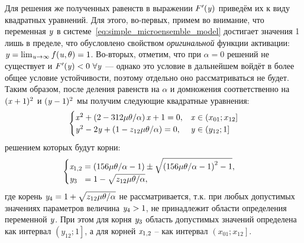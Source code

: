 Для решения же полученных равенств в выражении $F^{\prime}(\mathit{y})$ приведём их к виду квадратных уравнений. Для этого, во-первых, примем во внимание, что переменная $\mathit{y}$ в системе~\eqref{eq:simple_microensemble_model} достигает значения 1 лишь в пределе, что обусловлено свойством \textit{оригинальной} функции активации: $\mathit{y} = \lim_{\mathit{u} \to \infty} f(\mathit{u}, \theta) = 1$. Во-вторых, отметим, что при $\alpha = 0$ решений не существует и $F^{\prime}(\mathit{y}) < 0\ \forall \mathit{y}$ --- однако это условие в дальнейшем войдёт в более общее условие устойчивости, поэтому отдельно оно рассматриваться не будет. Таким образом, после деления равенств на $\alpha$ и домножения соответственно на $(\mathit{x} + 1)^{2}$ и $(\mathit{y} - 1)^{2}$ мы получим следующие квадратные уравнения:
\begin{equation}
    \nonumber
    \begin{cases}
        \mathit{x}^{2} + \left( 2 - 312 \mu \theta / \alpha \right) \mathit{x} + 1 = 0,     & \mathit{x} \in \left(x_{01}; x_{12}\right] \\
        \mathit{y}^{2} - 2 \mathit{y} + \left( 1 - z_{12} \mu \theta / \alpha \right) = 0,  & \mathit{y} \in \left(y_{12}; 1\right] \\
    \end{cases}
\end{equation}
решением которых будут корни:
\begin{equation}
    \nonumber
    \begin{cases}
        \scalar{x}_{1,2} = \left( 156 \mu \theta / \alpha - 1\right) \pm \sqrt{\left( 156 \mu \theta / \alpha - 1\right)^{2} - 1}, \\ %
        \scalar{y}_{3\phantom{,4}}   = 1 - \sqrt{z_{12} \mu \theta / \alpha},                                                      \\ %
    \end{cases}
\end{equation}
где корень $\mathit{y}_{4} = 1 + \sqrt{z_{12} \mu \theta / \alpha}$ не рассматривается, т.к. при любых допустимых значениях параметров величина $\mathit{y}_{4} > 1$, \ie не принадлежит области определения переменной $\mathit{y}$. При этом для корня $\mathit{y}_{3}$ область допустимых значений определена как интервал $\left(y_{12}; 1\right]$, а для корней $\mathit{x}_{1,2}$ -- как интервал $\left(x_{01}; x_{12}\right]$.

